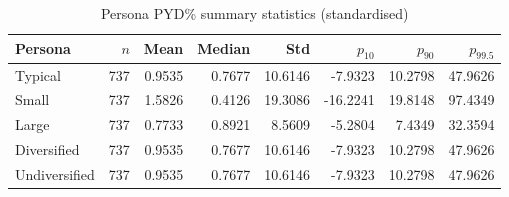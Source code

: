 \begin{table}[htbp]
\centering
\caption{Persona PYD\% summary statistics (standardised)}
\label{tab:persona_pyd_standardised}
\begin{tabular}{lrrrrrrr}
\toprule
\textbf{Persona} & $n$ & \textbf{Mean} & \textbf{Median} & \textbf{Std} & $p_{10}$ & $p_{90}$ & $p_{99.5}$ \\
\midrule
Typical & 737 & 0.9535 & 0.7677 & 10.6146 & -7.9323 & 10.2798 & 47.9626 \\
Small & 737 & 1.5826 & 0.4126 & 19.3086 & -16.2241 & 19.8148 & 97.4349 \\
Large & 737 & 0.7733 & 0.8921 & 8.5609 & -5.2804 & 7.4349 & 32.3594 \\
Diversified & 737 & 0.9535 & 0.7677 & 10.6146 & -7.9323 & 10.2798 & 47.9626 \\
Undiversified & 737 & 0.9535 & 0.7677 & 10.6146 & -7.9323 & 10.2798 & 47.9626 \\
\bottomrule
\end{tabular}
\end{table}
